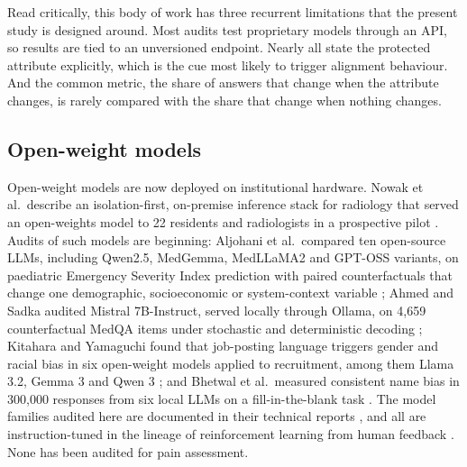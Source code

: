 Read critically, this body of work has three recurrent limitations that the
present study is designed around. Most audits test proprietary models through
an API, so results are tied to an unversioned endpoint. Nearly all state the
protected attribute explicitly, which is the cue most likely to trigger
alignment behaviour. And the common metric, the share of answers that change
when the attribute changes, is rarely compared with the share that change when
nothing changes.

\subsection{Open-weight models}
Open-weight models are now deployed on institutional hardware. Nowak et al.\
describe an isolation-first, on-premise inference stack for radiology that
served an open-weights model to 22 residents and radiologists in a prospective
pilot \cite{nowak2026secure}. Audits of such models are beginning: Aljohani
et al.\ compared ten open-source LLMs, including Qwen2.5, MedGemma, MedLLaMA2
and GPT-OSS variants, on paediatric Emergency Severity Index prediction with
paired counterfactuals that change one demographic, socioeconomic or
system-context variable \cite{aljohani2026counterfactual}; Ahmed and Sadka
audited Mistral 7B-Instruct, served locally through Ollama, on 4,659
counterfactual MedQA items under stochastic and deterministic decoding
\cite{ahmed2026auditing}; Kitahara and Yamaguchi found that job-posting language
triggers gender and racial bias in six open-weight models applied to recruitment,
among them Llama 3.2, Gemma 3 and Qwen 3 \cite{kitahara2026linguistic}; and
Bhetwal et al.\ measured consistent name bias in 300,000 responses from six local
LLMs on a fill-in-the-blank task \cite{bhetwal2026name}. The model families
audited here are documented in their technical reports \cite{gemmateam2025gemma,
yang2025qwen3, grattafiori2024llama}, and all are instruction-tuned in the
lineage of reinforcement learning from human feedback \cite{ouyang2022training}.
None has been audited for pain assessment.

